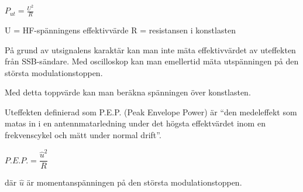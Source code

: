 \(P_{ut} = \frac{U^2}{R}\)

U = HF-spänningens effektivvärde
R = resistansen i konstlasten

På grund av utsignalens karaktär kan man inte mäta effektivvärdet av uteffekten
från SSB-sändare. Med oscilloskop kan man emellertid mäta utspänningen på den
största modulationstoppen.

Med detta toppvärde kan man beräkna spänningen över konstlasten.

Uteffekten definierad som P.E.P. (Peak Envelope Power) är ``den medeleffekt som
matas in i en antennmatarledning under det högsta effektvärdet inom en
frekvenscykel och mätt under normal drift''.

\(P.E.P. = \dfrac{\hat{u}^2}{R}\)

där \(\hat{u}\) är momentanspänningen på den största modulationstoppen.

